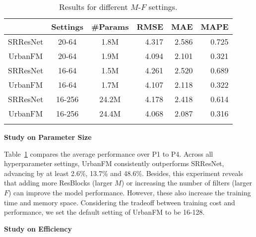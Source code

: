 \begin{table}[!b]
  \centering
  \caption{Results for different $M$-$F$ settings.}
  \vspace{-1em}
    \begin{tabular}{c|cc|rrr}
\shline
    \multicolumn{1}{c|}{Methods} & \multicolumn{1}{l}{Settings} & \multicolumn{1}{l|}{\#Params} & \multicolumn{1}{l}{RMSE} & \multicolumn{1}{l}{MAE} & \multicolumn{1}{l}{MAPE} \\
\hline
    SRResNet & 20-64 & 1.8M  & 4.317 & 2.586 & 0.725 \\
    UrbanFM & 20-64 & 1.9M  & 4.094 & 2.101 & 0.321 \\
\hline
    SRResNet & 16-64 & 1.5M  & 4.261 & 2.520 & 0.689 \\
    UrbanFM & 16-64 & 1.7M  & 4.107 & 2.118 & 0.322 \\
\hline
    SRResNet & 16-256 & 24.2M & 4.178 & 2.418 & 0.614 \\
    UrbanFM & 16-256 & 24.4M & 4.068 & 2.087 & 0.316 \\
\shline
    \end{tabular}\label{tab:params}\end{table} 
\vspace{1mm}
\noindent\textbf{Study on Parameter Size}

\noindent Table~\ref{tab:params} compares the average performance over P1 to P4. Across all hyperparameter settings, UrbanFM consistently outperforms SRResNet, advancing by at least 2.6\%, 13.7\% and 48.6\%. Besides, this experiment reveals that adding more ResBlocks (larger $M$) or increasing the number of filters (larger $F$) can improve the model performance. However, these also increase the training time and memory space. Considering the tradeoff between training cost and performance, we set the default setting of UrbanFM to be 16-128.

\vspace{1mm}
\noindent\textbf{Study on Efficiency}

